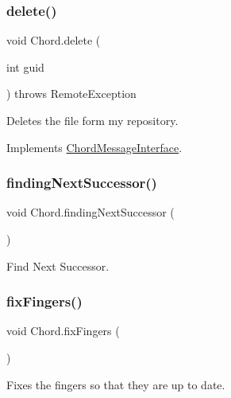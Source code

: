 \subsubsection{\texorpdfstring{delete()}{delete()}}
{\footnotesize\ttfamily void Chord.\+delete (\begin{DoxyParamCaption}\item[{int}]{guid }\end{DoxyParamCaption}) throws Remote\+Exception}



Deletes the file form my repository. 



Implements \hyperlink{interface_chord_message_interface_ab4d46beae8cea347c827b5618ea16104}{Chord\+Message\+Interface}.

\hypertarget{class_chord_a65c855dc1d8c6a82545899cb823dba2e}{}\label{class_chord_a65c855dc1d8c6a82545899cb823dba2e} 
\subsubsection{\texorpdfstring{finding\+Next\+Successor()}{findingNextSuccessor()}}
{\footnotesize\ttfamily void Chord.\+finding\+Next\+Successor (\begin{DoxyParamCaption}{ }\end{DoxyParamCaption})}



Find Next Successor. 

\hypertarget{class_chord_a02763f74bbd986baa7e6567bf9dc3c95}{}\label{class_chord_a02763f74bbd986baa7e6567bf9dc3c95} 
\subsubsection{\texorpdfstring{fix\+Fingers()}{fixFingers()}}
{\footnotesize\ttfamily void Chord.\+fix\+Fingers (\begin{DoxyParamCaption}{ }\end{DoxyParamCaption})}



Fixes the fingers so that they are up to date. 

\hypertarget{class_chord_a0425685114bc996226e87f417221c213}{}\label{class_chord_a0425685114bc996226e87f417221c213} 
